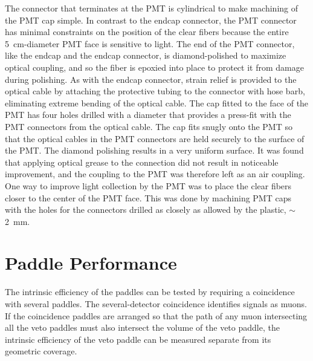 The connector that terminates at the PMT is cylindrical to make machining of the PMT cap simple.  In contrast to the endcap connector, the PMT connector has minimal constraints on the position of the clear fibers because the entire 5~cm-diameter PMT face is sensitive to light.  The end of the PMT connector, like the endcap and the endcap connector, is diamond-polished to maximize optical coupling, and so the fiber is epoxied into place to protect it from damage during polishing.  As with the endcap connector, strain relief is provided to the optical cable by attaching the protective tubing to the connector with hose barb, eliminating extreme bending of the optical cable.    
The cap fitted to the face of the PMT has four holes drilled with a diameter that provides a press-fit with the PMT connectors from the optical cable.  The cap fits snugly onto the PMT so that the optical cables in the PMT connectors are held securely to the surface of the PMT.  The diamond polishing results in a very uniform surface.  It was found that applying optical grease to the connection did not result in noticeable improvement, and the coupling to the PMT was therefore left as an air coupling.  One way to improve light collection by the PMT was to place the clear fibers closer to the center of the PMT face.  This was done by machining PMT caps with the holes for the connectors drilled as closely as allowed by the plastic, $\sim$2~mm.


\section{Paddle Performance}
\label{sec:singleVeto}

The intrinsic efficiency of the paddles can be tested by requiring a coincidence with several paddles.  The several-detector coincidence identifies signals as muons.  If the coincidence paddles are arranged so that the path of any muon intersecting all the veto paddles must also intersect the volume of the veto paddle, the intrinsic efficiency of the veto paddle can be measured separate from its geometric coverage.

